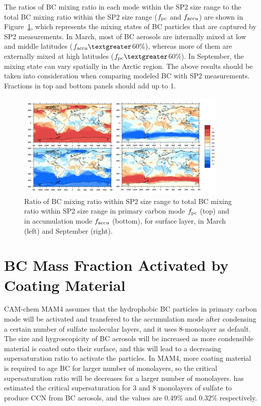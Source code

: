 \documentclass[12pt, fullpage]{uiucthesis2009}
\begin{document}
	The ratios of BC mixing ratio in each mode within the SP2 size range to the total BC mixing ratio within the SP2 size range ($f_{\rm pc}$ and $f_{\rm accu}$) are shown in Figure~\ref{fig_R7}, which represents the mixing states of BC particles that are captured by SP2 measurements. In March, most of BC aerosols are internally mixed at low and middle
	latitudes ($f_{\rm accu}\textgreater$60$\%$), whereas more of them are externally mixed at high latitudes ($f_{\rm pc}\textgreater$60$\%$). In September, the mixing state can vary spatially in the Arctic region. The above results should be taken into consideration when comparing modeled BC
	with SP2 measurements. Fractions in top and bottom panels should add up to 1.
	
	
	
	\begin{figure}[h] 
		\begin{center}
			\includegraphics[width = 0.9\textwidth]{Rplot04}
			\caption[Ratio of BC mixing ratio within SP2 size range to total BC mixing ratio within SP2 size range in primary carbon mode $f_{\rm pc}$ (top) and in accumulation mode $f_{\rm accu}$ (bottom), for surface layer, in March and September]{\label{fig_R7} Ratio of BC mixing ratio within SP2 size range to total BC mixing ratio within SP2 size range in primary carbon mode $f_{\rm pc}$ (top) and in accumulation mode $f_{\rm accu}$ (bottom), for surface layer, in March (left) and September (right).}
		\end{center}
	\end{figure}
	
	
	\section{BC Mass Fraction Activated by Coating Material}
	CAM-chem MAM4 assumes that the hydrophobic BC particles in  primary carbon mode will be activated and transfered to the accumulation mode after condensing a certain number of sulfate molecular layers, and it uses 8-monolayer as default. The size and hygroscopicity of BC aerosols will be increased as more condensible material is coated onto their surface, and this will lead to a decreasing supersaturation ratio to activate the particles. In MAM4, more coating material is required to age BC for larger number of monolayers, so the critical supersaturation ratio will be decreases for a larger number of monolayers. \cite{Liu2012} has estimated the critical supersaturation for 3 and 8 monolayers of sulfate to produce CCN from BC aerosols, and the values are 0.49$\%$ and 0.32$\%$ respectively. 
	
\end{document}
